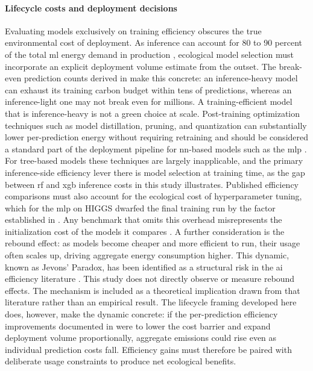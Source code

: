 \paragraph{Lifecycle costs and deployment decisions}
Evaluating models exclusively on training efficiency obscures the true environmental cost of deployment. As inference can account for 80 to 90 percent of the total \gls{ml} energy demand in production \cite{desislavovTrendsAIInference2023}, ecological model selection must incorporate an explicit deployment volume estimate from the outset. The break-even prediction counts derived in  make this concrete: an inference-heavy model can exhaust its training carbon budget within tens of predictions, whereas an inference-light one may not break even for millions. A training-efficient model that is inference-heavy is not a green choice at scale. Post-training optimization techniques such as model distillation, pruning, and quantization can substantially lower per-prediction energy without requiring retraining and should be considered a standard part of the deployment pipeline for \gls{nn}-based models such as the \gls{mlp} \cite{pattersonCarbonEmissionsLarge2021}. For tree-based models these techniques are largely inapplicable, and the primary inference-side efficiency lever there is model selection at training time, as the gap between \gls{rf} and \gls{xgb} inference costs in this study illustrates. Published efficiency comparisons must also account for the ecological cost of hyperparameter tuning, which for the \gls{mlp} on HIGGS dwarfed the final training run by the factor established in . Any benchmark that omits this overhead misrepresents the initialization cost of the models it compares \cite{strubellEnergyPolicyConsiderations2019a}. A further consideration is the rebound effect: as models become cheaper and more efficient to run, their usage often scales up, driving aggregate energy consumption higher. This dynamic, known as Jevons' Paradox, has been identified as a structural risk in the \gls{ai} efficiency literature \cite{luccioniPowerHungryProcessing2024}. This study does not directly observe or measure rebound effects. The mechanism is included as a theoretical implication drawn from that literature rather than an empirical result. The lifecycle framing developed here does, however, make the dynamic concrete: if the per-prediction efficiency improvements documented in  were to lower the cost barrier and expand deployment volume proportionally, aggregate emissions could rise even as individual prediction costs fall. Efficiency gains must therefore be paired with deliberate usage constraints to produce net ecological benefits.

